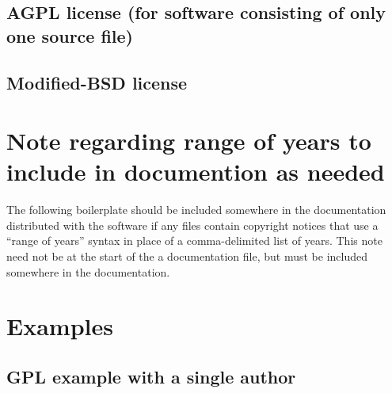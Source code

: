 \documentclass[10pt,a4paper]{article}
\begin{document}
\subsection{AGPL license (for software consisting of only one source file)}
\begin{boilerplate}

\end{boilerplate}

\subsection{Modified-BSD license}
\begin{boilerplate}

\end{boilerplate}



\section{Note regarding range of years to include in documention as needed}
\label{appendix:range.of.years}
The following boilerplate should be included somewhere in the 
documentation distributed with the software if any files contain copyright 
notices that use a ``range of years'' syntax in place of a comma-delimited 
list of years. This note need not be at the start of the a documentation file, 
but must be included somewhere in the documentation. 

\begin{boilerplate}

\end{boilerplate}



\section{Examples}

\subsection{GPL example with a single author}
\begin{boilerplate}

\end{boilerplate}
\end{document}
